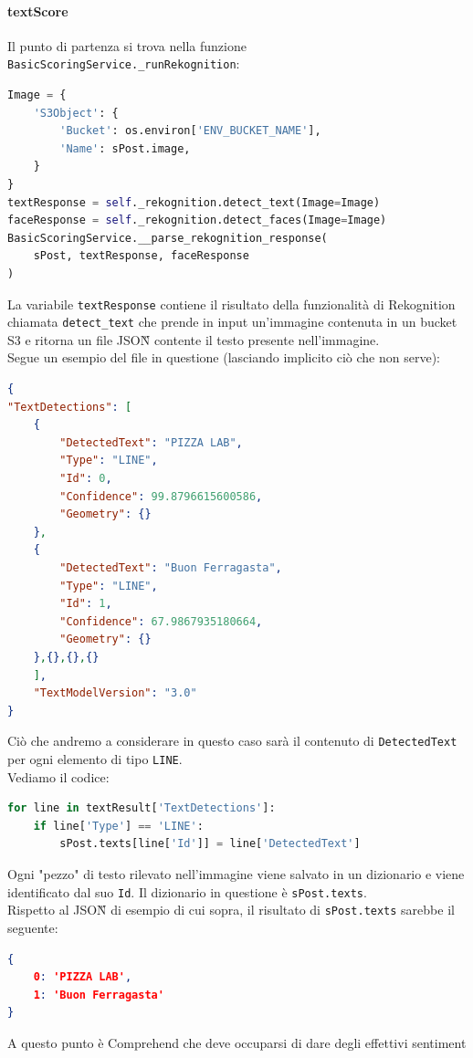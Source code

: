 \paragraph{textScore} \aCapo
Il punto di partenza si trova nella funzione \verb+BasicScoringService._runRekognition+:
\begin{lstlisting}[language=Python]
Image = {
    'S3Object': {
        'Bucket': os.environ['ENV_BUCKET_NAME'],
        'Name': sPost.image,
    }
}
textResponse = self._rekognition.detect_text(Image=Image)
faceResponse = self._rekognition.detect_faces(Image=Image)
BasicScoringService.__parse_rekognition_response(
    sPost, textResponse, faceResponse
)
\end{lstlisting}
La variabile \verb+textResponse+ contiene il risultato della funzionalità
di Rekognition chiamata \verb+detect_text+ che prende in input un'immagine contenuta
in un bucket S3 e ritorna un file JSON\G{} contente il testo presente nell'immagine.\\
Segue un esempio del file in questione (lasciando implicito ciò che non serve):
\begin{lstlisting}[language=JSON]
{
"TextDetections": [
    {
        "DetectedText": "PIZZA LAB",
        "Type": "LINE",
        "Id": 0,
        "Confidence": 99.8796615600586,
        "Geometry": {}
    },
    {
        "DetectedText": "Buon Ferragasta",
        "Type": "LINE",
        "Id": 1,
        "Confidence": 67.9867935180664,
        "Geometry": {}
    },{},{},{}
    ],
    "TextModelVersion": "3.0"
}        
\end{lstlisting}
Ciò che andremo a considerare in questo caso sarà il contenuto di \verb+DetectedText+
per ogni elemento di tipo \verb+LINE+.\\
Vediamo il codice: 
\begin{lstlisting}[language=Python]
for line in textResult['TextDetections']:
    if line['Type'] == 'LINE':
        sPost.texts[line['Id']] = line['DetectedText']
\end{lstlisting}
Ogni "pezzo" di testo rilevato nell'immagine viene salvato in un dizionario e viene
identificato dal suo \verb+Id+. Il dizionario in
questione è \verb+sPost.texts+.\\
Rispetto al JSON\G{} di esempio di cui sopra, il risultato di \verb+sPost.texts+ sarebbe il seguente:
\begin{lstlisting}[language=JSON]
{
    0: 'PIZZA LAB', 
    1: 'Buon Ferragasta'
}
\end{lstlisting}
A questo punto è Comprehend che deve occuparsi di dare degli effettivi sentiment
